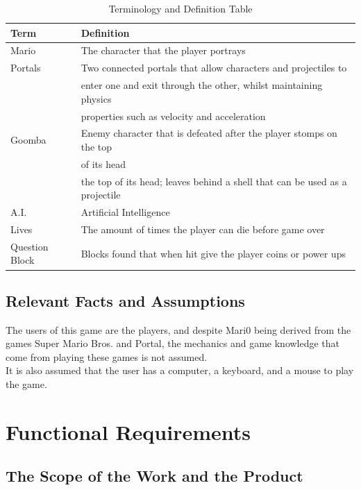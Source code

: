 \documentclass[12pt, titlepage]{article}
\begin{document}
\begin{table}
\caption{Terminology and Definition Table}
\begin{tabular}{l l}
\hline
Term			& Definition \\
\hline
Mario      		 & The character that the player portrays  \\
Portals      		 & Two connected portals that allow characters and projectiles to \\
			 & enter one and exit through the other, whilst maintaining physics \\
			 & properties such as velocity and acceleration \\
Goomba		 & Enemy character that is defeated after the player stomps on the top \\
			 & of its head	  \\
			 & the top of its head; leaves behind a shell that can be used as a projectile	\\
A.I.			 & Artificial Intelligence  \\
Lives			 & The amount of times the player can die before game over	\\
Question Block	 & Blocks found that when hit give the player coins or power ups	\\
\hline
\end{tabular}
\end{table}

\subsection{Relevant Facts and Assumptions}

The users of this game are the players, and despite Mari0 being derived from the games Super Mario Bros. and Portal, the mechanics and game knowledge that come from playing these games is not assumed. \\
It is also assumed that the user has a computer, a keyboard, and a mouse to play the game.

\section{Functional Requirements}

\subsection{The Scope of the Work and the Product}
\end{document}
